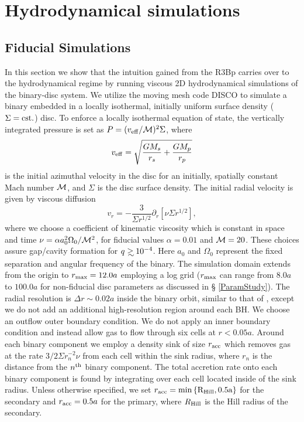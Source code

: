 \section{Hydrodynamical simulations}
\label{Hydrodynamical Simulations}
\subsection{Fiducial Simulations}
\label{Fiducial Simulations}
In this section we show that the intuition gained from the R3Bp
carries over to the hydrodynamical regime by running viscous 2D
hydrodynamical simulations of the binary-disc system.  We utilize the
moving mesh code DISCO \citep{Duffell:2011:TESS} to simulate a binary
embedded in a locally isothermal, initially uniform surface density
($\Sigma = \rm{cst.}$) disc. To enforce a locally isothermal equation
of state, the vertically integrated pressure is set as
$P=(v_{\rm{eff}} / \mathcal{M})^2 \Sigma$, where
\begin{equation}
v_{\rm{eff}} =  \sqrt{\frac{GM_s}{r_s} + \frac{GM_p}{r_p}}
\end{equation}
is the initial azimuthal velocity in the disc for an initially,
spatially constant Mach number $\mathcal{M}$, and $\Sigma$ is the disc
surface density. The initial radial velocity is given by viscous
diffusion
\begin{equation}
v_r = - \frac{3}{\Sigma r^{1/2}} \partial_{r}\left[ \nu \Sigma  r^{1/2}\right],
\end{equation}
where we choose a coefficient of kinematic viscosity which is constant
in space and time $\nu = \alpha a^2_0 \Omega_{0} /\mathcal{M}^2$, for
fiducial values $\alpha = 0.01$ and $\mathcal{M} = 20$. These choices assure
gap/cavity formation for $q\gsim10^{-4}$. Here $a_0$ and $\Omega_0$
represent the fixed separation and angular frequency of the
binary. The simulation domain extends from the origin to $r_{\rm{max}} = 12.0a$
employing a log grid ($r_{\rm{max}}$ can range from $8.0a$ to $100.0a$
for non-fiducial disc parameters as discussed in \S
\ref{ParamStudy}). The radial resolution is $\Delta r \sim 0.02a$
inside the binary orbit, similar to that of \cite{Farris:2014}, except
we do not add an additional high-resolution region around each BH. We
choose an outflow outer boundary condition. We do not apply an inner
boundary condition and instead allow gas to flow through six cells at
$r<0.05a$. Around each binary component we employ a density sink of
size $r_{\rm{acc}}$ which removes gas at the rate $3/2 \Sigma r^{-2}_n
\nu$ from each cell within the sink radius, where $r_n$ is the
distance from the $n^{\rm{th}}$ binary component. The total accretion
rate onto each binary component is found by integrating over each cell
located inside of the sink radius. Unless otherwise specified, we set
$r_{\rm{acc}} = \rm{min}\left\{ R_{\rm{Hill}}, 0.5a \right\}$ for the
secondary and $r_{\rm{acc}}= 0.5a$ for the primary, where
$R_{\rm{Hill}}$ is the Hill radius of the secondary.

